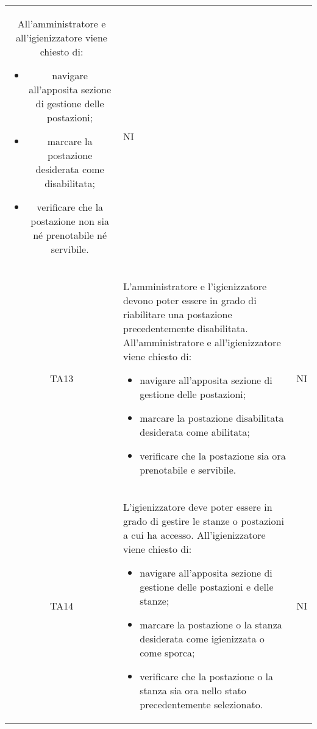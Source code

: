 {\begin{longtable}{ c C{11cm} c }
        All'amministratore e all'igienizzatore viene chiesto di:
        \begin{itemize}
            \item navigare all'apposita sezione di gestione delle postazioni;
            \item marcare la postazione desiderata come disabilitata;
            \item verificare che la postazione non sia né prenotabile né servibile.
        \end{itemize}&
        NI\\
        TA13&
        L'amministratore e l'igienizzatore devono poter essere in grado di riabilitare una postazione precedentemente disabilitata.\newline
        All'amministratore e all'igienizzatore viene chiesto di:
        \begin{itemize}
            \item navigare all'apposita sezione di gestione delle postazioni;
            \item marcare la postazione disabilitata desiderata come abilitata;
            \item verificare che la postazione sia ora prenotabile e servibile.
        \end{itemize}&
        NI\\
        TA14&
        L'igienizzatore deve poter essere in grado di gestire le stanze o postazioni a cui ha accesso.\newline
        All'igienizzatore viene chiesto di:
        \begin{itemize}
            \item navigare all'apposita sezione di gestione delle postazioni e delle stanze;
            \item marcare la postazione o la stanza desiderata come igienizzata o come sporca;
            \item verificare che la postazione o la stanza sia ora nello stato precedentemente selezionato.
        \end{itemize}&
        NI\\
        
        
    \end{longtable}
}